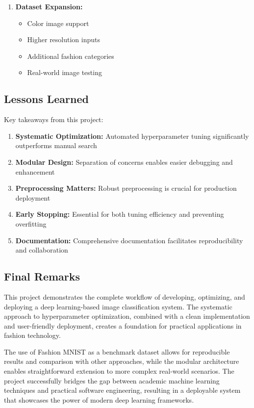 \documentclass[12pt,a4paper]{article}
\begin{document}
\begin{enumerate}
    \item \textbf{Dataset Expansion:}
    \begin{itemize}
        \item Color image support
        \item Higher resolution inputs
        \item Additional fashion categories
        \item Real-world image testing
    \end{itemize}
\end{enumerate}

\subsection{Lessons Learned}

Key takeaways from this project:

\begin{enumerate}
    \item \textbf{Systematic Optimization:} Automated hyperparameter tuning significantly outperforms manual search
    \item \textbf{Modular Design:} Separation of concerns enables easier debugging and enhancement
    \item \textbf{Preprocessing Matters:} Robust preprocessing is crucial for production deployment
    \item \textbf{Early Stopping:} Essential for both tuning efficiency and preventing overfitting
    \item \textbf{Documentation:} Comprehensive documentation facilitates reproducibility and collaboration
\end{enumerate}

\subsection{Final Remarks}

This project demonstrates the complete workflow of developing, optimizing, and deploying a deep learning-based image classification system. The systematic approach to hyperparameter optimization, combined with a clean implementation and user-friendly deployment, creates a foundation for practical applications in fashion technology.

The use of Fashion MNIST as a benchmark dataset allows for reproducible results and comparison with other approaches, while the modular architecture enables straightforward extension to more complex real-world scenarios. The project successfully bridges the gap between academic machine learning techniques and practical software engineering, resulting in a deployable system that showcases the power of modern deep learning frameworks.
\end{document}
